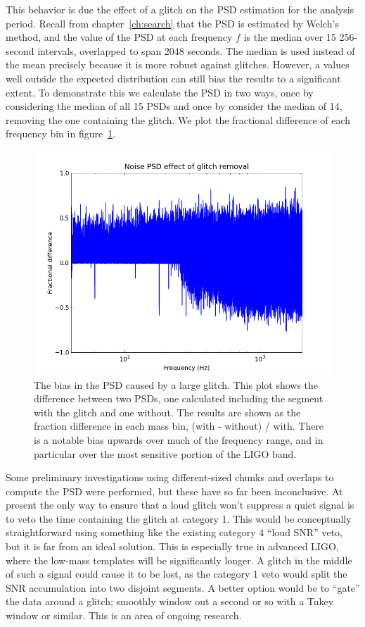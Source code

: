 This behavior is due the effect of a glitch on the PSD estimation for
the analysis period.  Recall from chapter~\ref{ch:search} that the PSD
is estimated by Welch's method, and the value of the PSD at each
frequency $f$ is the median over 15 256-second intervals, overlapped
to span 2048 seconds.  The median is used instead of the mean
precisely because it is more robust against glitches.  However, a
values well outside the expected distribution can still bias the
results to a significant extent.  To demonstrate this we calculate the
PSD in two ways, once by considering the median of all 15 PSDs and
once by consider the median of 14, removing the one containing the 
glitch.  We plot the fractional difference of each frequency bin in
figure~\ref{f:median_bias}.


\begin{figure}
  \includegraphics[width=\linewidth]{figures/detchar/spectra_diffs}
  \caption[Bias in the PSD caused by a large glitch] {
  \label{f:median_bias}
The bias in the PSD caused by a large glitch.  This plot shows the
difference between two PSDs, one calculated including the
segment with the glitch and one without.  The results are shown as 
the fraction difference in each mass bin, (with - without) / with.
There is a notable bias upwards over much of the frequency range, and
in particular over the most sensitive portion of the LIGO band.
}
\end{figure}%

Some preliminary investigations using different-sized chunks and
overlaps to compute the PSD were performed, but these have so far been
inconclusive.  At present the only way to ensure that a loud glitch
won't suppress a quiet signal is to veto the time containing the
glitch at category 1.  This would be conceptually straightforward
using something like the existing category 4 ``loud SNR'' veto, but it
is far from an ideal solution.  This is especially true in advanced
LIGO, where the low-mass templates will be significantly longer.  A
glitch in the middle of such a signal could cause it to be lost, as
the category 1 veto would split the SNR accumulation into two disjoint
segments.   A better option would be to ``gate'' the data around a
glitch; smoothly window out a second or so with a Tukey window or
similar.  This is an area of ongoing research.




